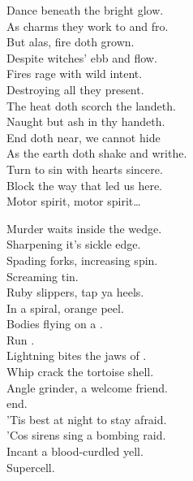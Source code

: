 Dance beneath the  bright glow. \\
As charms they work to and fro. \\
But alas, fire doth grown. \\
Despite witches' ebb and flow. \\
Fires rage with wild intent. \\
Destroying all they present. \\
The heat doth scorch the landeth. \\
Naught but ash in thy handeth. \\

End doth near, we cannot hide \\
As the earth doth shake and writhe. \\
Turn to sin with hearts sincere. \\
Block the way that led us here. \\

Motor spirit, motor spirit… \\




Murder waits inside the wedge. \\
Sharpening it's sickle edge. \\
Spading forks, increasing spin. \\
Screaming tin. \\
Ruby slippers, tap ya heels. \\
In a spiral, orange peel. \\
Bodies flying on a . \\
Run . \\

Lightning bites the jaws of . \\
Whip crack the tortoise shell. \\
Angle grinder, a welcome friend. \\
 end. \\
'Tis best at night to stay afraid. \\
'Cos sirens sing a bombing raid. \\
Incant a blood-curdled yell. \\
Supercell. \\

